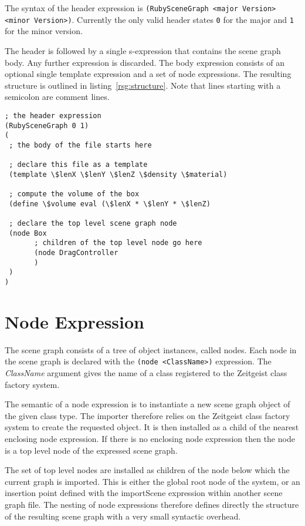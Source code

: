 The syntax of the header expression is \texttt{(RubySceneGraph <major
  Version> <minor Version>)}. Currently the only valid header states
\texttt{0} for the major and \texttt{1} for the minor version.

The header is followed by a single s-expression that contains the
scene graph body. Any further expression is discarded. The body
expression consists of an optional single template expression and a
set of node expressions. The resulting structure is outlined in
listing~\ref{rsg:structure}. Note that lines starting with a semicolon
are comment lines.

\begin{lstlisting}[caption={File Structure},label=rsg:structure]
; the header expression
(RubySceneGraph 0 1)
(
 ; the body of the file starts here

 ; declare this file as a template
 (template \$lenX \$lenY \$lenZ \$density \$material)

 ; compute the volume of the box
 (define \$volume eval (\$lenX * \$lenY * \$lenZ)

 ; declare the top level scene graph node
 (node Box
       ; children of the top level node go here
       (node DragController
       )
 )
)

\end{lstlisting}

\section{Node Expression}

The scene graph consists of a tree of object instances, called nodes.
Each node in the scene graph is declared with the \texttt{(node
<ClassName>)} expression. The \emph{ClassName} argument gives the name
of a class registered to the Zeitgeist class factory system.

The semantic of a node expression is to instantiate a new scene graph
object of the given class type. The importer therefore relies on the
Zeitgeist class factory system to create the requested object. It is
then installed as a child of the nearest enclosing node expression. If
there is no enclosing node expression then the node is a top level
node of the expressed scene graph.

The set of top level nodes are installed as children of the node below
which the current graph is imported. This is either the global root
node of the system, or an insertion point defined with the importScene
expression within another scene graph file. The nesting of node
expressions therefore defines directly the structure of the resulting
scene graph with a very small syntactic overhead.

